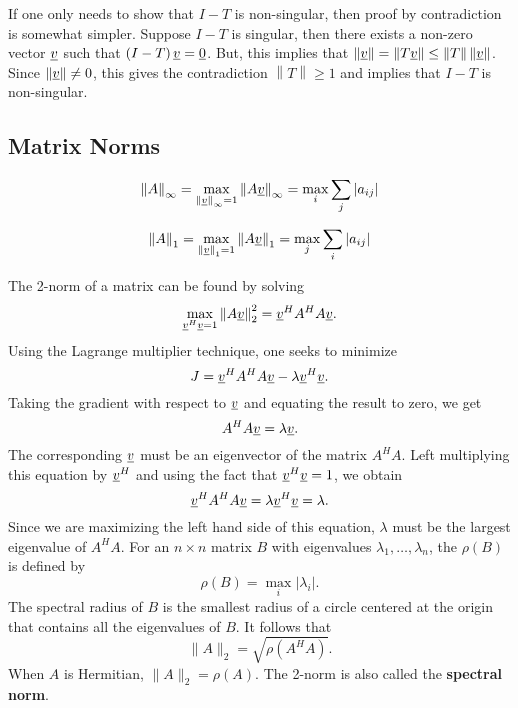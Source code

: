 If one only needs to show that $I - T$ is non-singular, then proof by contradiction is somewhat simpler.
Suppose $I - T$ is singular, then there exists a non-zero vector $\underline{v}$ such that $ \left( I - T \right) \underline{v} = \underline{0}$.
But, this implies that $\left\| \underline{v} \right\| = \left\| T \underline{v} \right\| \leq \left\| T \right\| \left\| \underline{v} \right\|$.
Since $\| \underline{v} \| \neq 0$, this gives the contradiction $\left\| T \right\| \geq 1$ and implies that $I-T$ is non-singular.

\subsection{Matrix Norms}

\begin{equation*}
\left\| A \right\|_{\infty} = \max_{\left\| \underline{v} \right\|_{\infty} = 1} \left\| A \underline{v} \right\|_{\infty} = \max_{i} \sum_{j} |a_{ij}|
\end{equation*}

\begin{equation*}
\left\| A \right\|_{1} = \max_{\left\| \underline{v} \right\|_{1} = 1} \left\| A \underline{v} \right\|_{1} = \max_{j} \sum_{i} |a_{ij}|
\end{equation*}

The 2-norm of a matrix can be found by solving
\begin{equation*}
\max_{\underline{v}^H \underline{v} = 1} \left\| A \underline{v} \right\|_{2}^{2}
= \underline{v}^H A^H A \underline{v} .
\end{equation*}
Using the Lagrange multiplier technique, one seeks to minimize
\begin{equation*}
J = \underline{v}^H A^H A \underline{v} - \lambda \underline{v}^H \underline{v} .
\end{equation*}
Taking the gradient with respect to $\underline{v}$ and equating the result to zero, we get
\begin{equation*}
A^H A \underline{v} = \lambda \underline{v} .
\end{equation*}
The corresponding $\underline{v}$ must be an eigenvector of the matrix $A^H A$.
Left multiplying this equation by $\underline{v}^H$ and using the fact that $\underline{v}^H \underline{v} = 1$, we obtain
\begin{equation*}
\underline{v}^H A^H A \underline{v} = \lambda \underline{v}^H \underline{v} = \lambda .
\end{equation*}
Since we are maximizing the left hand side of this equation, $\lambda$ must be the largest eigenvalue of $A^H A$.
For an $n \times n$ matrix $B$ with eigenvalues $\lambda_1, \ldots, \lambda_n$, the  $\rho (B)$ is defined by
\begin{equation*}
\rho (B) = \max_{i} | \lambda_i | .
\end{equation*}
The spectral radius of $B$ is the smallest radius of a circle centered at the origin that contains all the eigenvalues of $B$.
It follows that
\begin{equation*}
\| A \|_2 = \sqrt{ \rho (A^H A) } .
\end{equation*}
When $A$ is Hermitian, $\| A \|_2 = \rho(A)$.
The 2-norm is also called the \textbf{spectral norm}.

